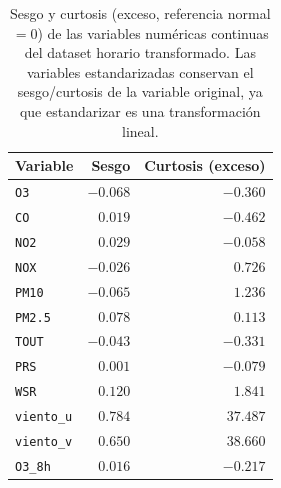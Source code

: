 \begin{table}[t]
  \centering
  \caption{Sesgo y curtosis (exceso, referencia normal $=0$) de las
    variables numéricas continuas del dataset horario transformado. Las
    variables estandarizadas conservan el sesgo/curtosis de la variable
    original, ya que estandarizar es una transformación lineal.}
  \label{tab:sesgo-curtosis-horario}
  \small
  \begin{tabular}{lrr}
    \toprule
    Variable & Sesgo & Curtosis (exceso) \\
    \midrule
    \texttt{O3}       & $-0.068$ & $-0.360$ \\
    \texttt{CO}       & $0.019$  & $-0.462$ \\
    \texttt{NO2}      & $0.029$  & $-0.058$ \\
    \texttt{NOX}      & $-0.026$ & $0.726$  \\
    \texttt{PM10}     & $-0.065$ & $1.236$  \\
    \texttt{PM2.5}    & $0.078$  & $0.113$  \\
    \texttt{TOUT}     & $-0.043$ & $-0.331$ \\
    \texttt{PRS}      & $0.001$  & $-0.079$ \\
    \texttt{WSR}      & $0.120$  & $1.841$  \\
    \texttt{viento\_u} & $0.784$  & $37.487$ \\
    \texttt{viento\_v} & $0.650$  & $38.660$ \\
    \texttt{O3\_8h}   & $0.016$  & $-0.217$ \\
    \bottomrule
  \end{tabular}
\end{table}
